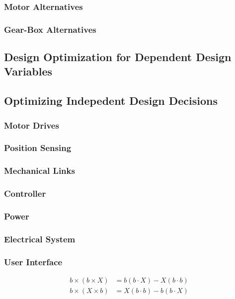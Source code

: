 \documentclass[a4paper,10pt]{article}
\begin{document}
\subsubsection{Motor Alternatives}

\subsubsection{Gear-Box Alternatives}

\subsection{Design Optimization for Dependent Design Variables}

\subsection{Optimizing Indepedent Design Decisions}
\subsubsection{Motor Drives}

\subsubsection{Position Sensing}

\subsubsection{Mechanical Links}

\subsubsection{Controller}

\subsubsection{Power}

\subsubsection{Electrical System}

\subsubsection{User Interface}

\newpage
\begin{align}
 b\times(b\times X) &= b(b\cdot X)-X(b\cdot b) \nonumber \\
 b\times(X\times b) &= X(b\cdot b)-b(b\cdot X) \nonumber \\
\end{align}
\end{document}
